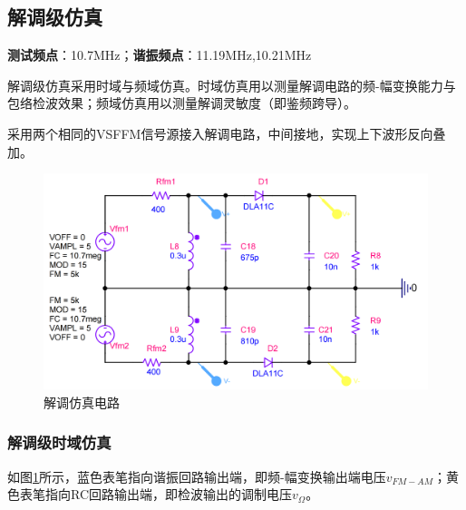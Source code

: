 \documentclass[a4paper,12pt,twoside]{article}
\begin{document}
\subsection{解调级仿真}
\textbf{测试频点}：10.7MHz；\textbf{谐振频点}：11.19MHz,10.21MHz

解调级仿真采用时域与频域仿真。时域仿真用以测量解调电路的频-幅变换能力与包络检波效果；频域仿真用以测量解调灵敏度（即鉴频跨导）。

采用两个相同的VSFFM信号源接入解调电路，中间接地，实现上下波形反向叠加。
\begin{figure}[H]
    \centering
    \includegraphics[scale=0.18]{解调仿真电路.png}
    \caption{解调仿真电路}
    \label{解调仿真电路}
\end{figure}


\subsubsection{解调级时域仿真}
如图\ref{解调仿真电路}所示，蓝色表笔指向谐振回路输出端，即频-幅变换输出端电压$v_{FM-AM}$；黄色表笔指向RC回路输出端，即检波输出的调制电压$v_{\Omega}$。
\end{document}
